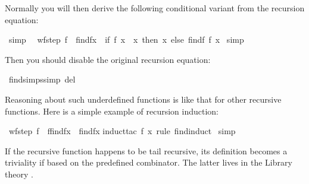 \begin{isabellebody}
\begin{isamarkuptext}
Normally you will then derive the following conditional variant from
the recursion equation:%
\end{isamarkuptext}%
\isamarkuptrue%
\ {\isacharbrackleft}simp{\isacharbrackright}{\isacharcolon}\isanewline
\ \ {\isachardoublequote}wf{\isacharparenleft}step{}\ f{\isacharparenright}\ {\isasymLongrightarrow}\ find{\isacharparenleft}f{\isacharcomma}x{\isacharparenright}\ {\isacharequal}\ {\isacharparenleft}if\ f\ x\ {\isacharequal}\ x\ then\ x\ else\ find{\isacharparenleft}f{\isacharcomma}\ f\ x{\isacharparenright}{\isacharparenright}{\isachardoublequote}\isanewline
\isamarkupfalse%
\ simp\isamarkupfalse%
%
\begin{isamarkuptext}%
\noindent Then you should disable the original recursion equation:%
\end{isamarkuptext}%
\isamarkuptrue%
\ find{\isachardot}simps{\isacharbrackleft}simp\ del{\isacharbrackright}\isamarkupfalse%
%
\begin{isamarkuptext}%
Reasoning about such underdefined functions is like that for other
recursive functions.  Here is a simple example of recursion induction:%
\end{isamarkuptext}%
\isamarkuptrue%
\ {\isachardoublequote}wf{\isacharparenleft}step{}\ f{\isacharparenright}\ {\isasymlongrightarrow}\ f{\isacharparenleft}find{\isacharparenleft}f{\isacharcomma}x{\isacharparenright}{\isacharparenright}\ {\isacharequal}\ find{\isacharparenleft}f{\isacharcomma}x{\isacharparenright}{\isachardoublequote}\isanewline
\isamarkupfalse%
induct{\isacharunderscore}tac\ f\ x\ rule{\isacharcolon}\ find{\isachardot}induct{\isacharparenright}\isanewline
\isamarkupfalse%
\ simp\isanewline
\isamarkupfalse%
\isamarkupfalse%
%
\isamarkuptrue%
%
\begin{isamarkuptext}%
If the recursive function happens to be tail recursive, its
definition becomes a triviality if based on the predefined 
combinator.  The latter lives in the Library theory .


\end{isamarkuptext}
\end{isabellebody}
